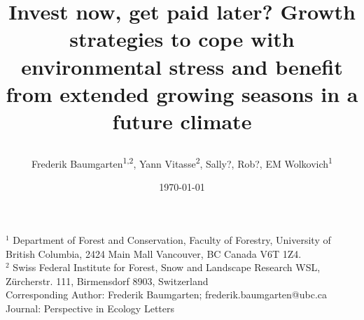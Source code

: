 \documentclass{article}
\begin{document}
	
	
	\title{Invest now, get paid later? Growth strategies to cope with environmental stress and benefit from extended growing seasons in a future climate %
		
		
	} 
	
	\date{\today}
	\author{Frederik Baumgarten\textsuperscript{1,2}, Yann Vitasse\textsuperscript{2}, Sally?, Rob?, EM Wolkovich\textsuperscript{1}}
	\maketitle
	
	$^1$ Department of Forest and Conservation, Faculty of Forestry, University of British Columbia, 2424 Main Mall
	Vancouver, BC Canada V6T 1Z4. \\
	
	$^2$  Swiss Federal Institute for Forest, Snow and Landscape Research WSL, Zürcherstr. 111, Birmensdorf 8903, Switzerland\\
	
	Corresponding Author: Frederik Baumgarten; frederik.baumgarten@ubc.ca \\
	Journal: Perspective in Ecology Letters
	
	
	
	
\end{document}
